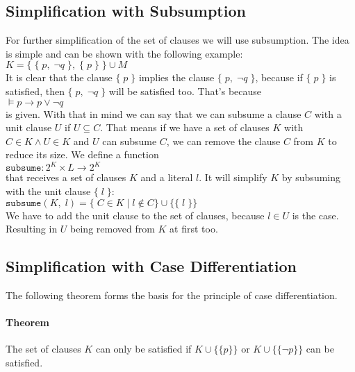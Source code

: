 \subsection{Simplification with Subsumption}
\label{sub:sciDavisPutnamSubsumption}
For further simplification of the set of clauses we will use subsumption. The idea is simple and can be shown with the following example:
\\[0.2cm]
\hspace*{1.3cm} $K = \{\; \{\; p,\; \neg q \;\},\; \{\; p\; \}\; \} \cup M$
\\[0.2cm]
It is clear that the clause $\{\; p\; \}$ implies the clause $\{\; p,\; \neg q \;\}$, because if $\{\; p\; \}$ is satisfied, then $\{\; p,\; \neg q \;\}$ will be satisfied too. That's because
\\[0.2cm]
\hspace*{1.3cm} $\models p \to p \lor \neg q$
\\[0.2cm]
is given. With that in mind we can say that we can subsume a clause $C$ with a unit clause $U$ if $U \subseteq C$. That means if we have a set of clauses $K$ with $C \in K \land U \in K$ and $U$ can subsume $C$, we can remove the clause $C$ from $K$ to reduce its size. We define a function
\\[0.2cm]
\hspace*{1.3cm} $\texttt{subsume}: 2^{K} \times L \to 2^{K}$
\\[0.2cm]
that receives a set of clauses $K$ and a literal $l$. It will simplify $K$ by subsuming with the unit clause $\{\; l\; \}$:
\\[0.2cm]
\hspace*{1.3cm} $\texttt{subsume}(K,\; l) = \{\; C \in K\; |\; l \notin C\} \cup \{\{\; l\; \}\}$
\\[0.2cm]
We have to add the unit clause to the set of clauses, because $l \in U$ is the case. Resulting in $U$ being removed from $K$ at first too. \cite{Stroetman2019}

\subsection{Simplification with Case Differentiation}
\label{sub:sciDavisPutnamCaseDiv}
The following theorem forms the basis for the principle of case differentiation.

\paragraph{Theorem}
The set of clauses $K$ can only be satisfied if $K \cup \bigl\{\{p\}\bigr\}$ or $K \cup \bigl\{\{\neg p\}\bigr\}$ can be satisfied.

